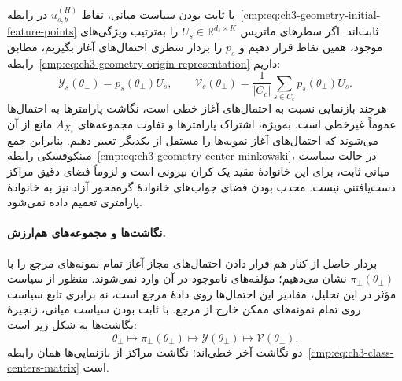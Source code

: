 با ثابت بودن سیاست میانی، نقاط $u_{s,b}^{(H)}$ در رابطه~\eqref{cmp:eq:ch3-geometry-initial-feature-points} ثابت‌اند. اگر سطرهای ماتریس $U_s\in\mathbb R^{d_s\times K}$ را به‌ترتیب ویژگی‌های موجود، همین نقاط قرار دهیم و $p_s$ را بردار سطری احتمال‌های آغاز بگیریم، مطابق رابطه~\eqref{cmp:eq:ch3-geometry-origin-representation} داریم:
\begin{equation}\label{cmp:eq:ch3-geometry-parametric-start-representation}
\mathscr Y_s(\theta_\bot)=p_s(\theta_\bot)U_s,
\qquad
\mathcal V_c(\theta_\bot)=\frac{1}{|C_c|}\sum_{s\in C_c}p_s(\theta_\bot)U_s.
\end{equation}
هرچند بازنمایی نسبت به احتمال‌های آغاز خطی است، نگاشت پارامترها به احتمال‌ها عموماً غیرخطی است. به‌ویژه، اشتراک پارامترها و تفاوت مجموعه‌های $A_{X_s}$ مانع از آن می‌شوند که احتمال‌های آغاز نمونه‌ها را مستقل از یکدیگر تغییر دهیم. بنابراین جمع مینکوفسکی رابطه~\eqref{cmp:eq:ch3-geometry-center-minkowski}، در حالت سیاست میانی ثابت، برای این خانوادهٔ مقید یک کران بیرونی است و لزوماً فضای دقیق مراکز دست‌یافتنی نیست. محدب بودن فضای جواب‌های خانوادهٔ گره‌محور آزاد نیز به خانوادهٔ پارامتری تعمیم داده نمی‌شود.

\paragraph{نگاشت‌ها و مجموعه‌های هم‌ارزش.}
بردار حاصل از کنار هم قرار دادن احتمال‌های مجاز آغاز تمام نمونه‌های مرجع را با $\pi_\bot(\theta_\bot)$ نشان می‌دهیم؛ مؤلفه‌های ناموجود در آن وارد نمی‌شوند. منظور از سیاست مؤثر در این تحلیل، مقادیر این احتمال‌ها روی دادهٔ مرجع است، نه برابری تابع سیاست روی تمام نمونه‌های ممکن خارج از مرجع. با ثابت بودن سیاست میانی، زنجیرهٔ نگاشت‌ها به شکل زیر است:
\begin{equation}\label{cmp:eq:ch3-geometry-parametric-start-chain}
\theta_\bot\longmapsto\pi_\bot(\theta_\bot)
\longmapsto\mathscr Y(\theta_\bot)
\longmapsto\mathcal V(\theta_\bot).
\end{equation}
دو نگاشت آخر خطی‌اند؛ نگاشت مراکز از بازنمایی‌ها همان رابطه~\eqref{cmp:eq:ch3-class-centers-matrix} است.


